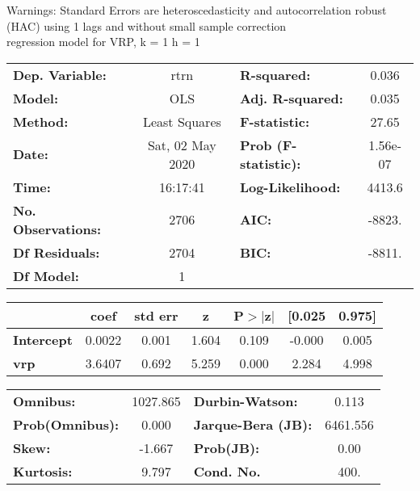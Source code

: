 Warnings: \newline
 [1] Standard Errors are heteroscedasticity and autocorrelation robust (HAC) using 1 lags and without small sample correction\\ 

regression model for VRP, k = 1 h = 1\begin{center}
\begin{tabular}{lclc}
\toprule
\textbf{Dep. Variable:}    &       rtrn       & \textbf{  R-squared:         } &     0.036   \\
\textbf{Model:}            &       OLS        & \textbf{  Adj. R-squared:    } &     0.035   \\
\textbf{Method:}           &  Least Squares   & \textbf{  F-statistic:       } &     27.65   \\
\textbf{Date:}             & Sat, 02 May 2020 & \textbf{  Prob (F-statistic):} &  1.56e-07   \\
\textbf{Time:}             &     16:17:41     & \textbf{  Log-Likelihood:    } &    4413.6   \\
\textbf{No. Observations:} &        2706      & \textbf{  AIC:               } &    -8823.   \\
\textbf{Df Residuals:}     &        2704      & \textbf{  BIC:               } &    -8811.   \\
\textbf{Df Model:}         &           1      & \textbf{                     } &             \\
\bottomrule
\end{tabular}
\begin{tabular}{lcccccc}
                   & \textbf{coef} & \textbf{std err} & \textbf{z} & \textbf{P$> |$z$|$} & \textbf{[0.025} & \textbf{0.975]}  \\
\midrule
\textbf{Intercept} &       0.0022  &        0.001     &     1.604  &         0.109        &       -0.000    &        0.005     \\
\textbf{vrp}       &       3.6407  &        0.692     &     5.259  &         0.000        &        2.284    &        4.998     \\
\bottomrule
\end{tabular}
\begin{tabular}{lclc}
\textbf{Omnibus:}       & 1027.865 & \textbf{  Durbin-Watson:     } &    0.113  \\
\textbf{Prob(Omnibus):} &   0.000  & \textbf{  Jarque-Bera (JB):  } & 6461.556  \\
\textbf{Skew:}          &  -1.667  & \textbf{  Prob(JB):          } &     0.00  \\
\textbf{Kurtosis:}      &   9.797  & \textbf{  Cond. No.          } &     400.  \\
\bottomrule
\end{tabular}
\end{center}

